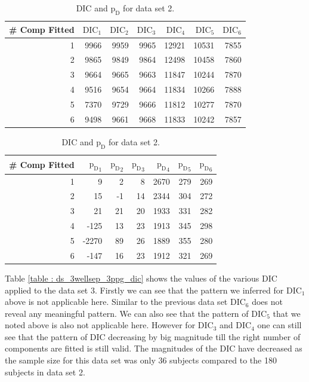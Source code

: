 \begin{table}[!htb]
\centering
\caption{DIC and $\text{p}_\text{D}$ for data set 2.}
\label{table : ds_3wellsep_dic} 
\begin{tabular}{@{}rrrrrrr@{}}
\toprule
\# Comp Fitted & $\text{DIC}_1$ & $\text{DIC}_2$  & $\text{DIC}_3$  & $\text{DIC}_4$  & $\text{DIC}_5$  & $\text{DIC}_6$  \\ \midrule
1 & 9966 & 9959 & 9965 & 12921 & 10531 & 7855 \\
2 & 9865 & 9849 & 9864 & 12498 & 10458 & 7860 \\
3 & 9664 & 9665 & 9663 & 11847 & 10244 & 7870 \\
4 & 9516 & 9654 & 9664 & 11834 & 10266 & 7888 \\
5 & 7370 & 9729 & 9666 & 11812 & 10277 & 7870 \\
6 & 9498 & 9661 & 9668 & 11833 & 10242 & 7857 \\ \bottomrule
\end{tabular}

\begin{tabular}{@{}rrrrrrr@{}}
\toprule
\# Comp Fitted & ${\text{p}_\text{D}}_1$ & ${\text{p}_\text{D}}_2$ & ${\text{p}_\text{D}}_3$ & ${\text{p}_\text{D}}_4$ & ${\text{p}_\text{D}}_5$ & ${\text{p}_\text{D}}_6$ \\ \midrule
1 & 9 & 2 & 8 & 2670 & 279 & 269 \\
2 & 15 & -1 & 14 & 2344 & 304 & 272 \\
3 & 21 & 21 & 20 & 1933 & 331 & 282 \\
4 & -125 & 13 & 23 & 1913 & 345 & 298 \\
5 & -2270 & 89 & 26 & 1889 & 355 & 280 \\
6 & -147 & 16 & 23 & 1912 & 321 & 269 \\ \bottomrule
\end{tabular}
\end{table}

Table \ref{table : ds_3wellsep_3ppg_dic} shows the values of the various DIC applied to the data set 3. Firstly we can see that the pattern we inferred for $\text{DIC}_1$ above is not applicable here. Similar to the previous data set $\text{DIC}_6$ does not reveal any meaningful pattern. We can also see that the pattern of $\text{DIC}_5$ that we noted above is also not applicable here. However for $\text{DIC}_3$ and $\text{DIC}_4$ one can still see that the pattern of DIC decreasing by big magnitude till the right number of components are fitted is still valid. The magnitudes of the DIC have decreased as the sample size for this data set was only 36 subjects compared to the 180 subjects in data set 2.


